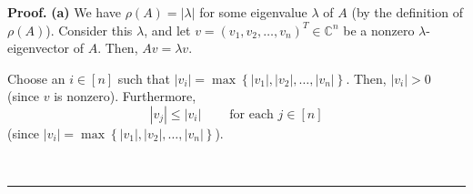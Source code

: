 \documentclass[numbers=enddot,12pt,final,onecolumn,notitlepage]{scrartcl}%
\numberwithin{exer}{subsection}
\theoremstyle{definition}
\newenvironment{proof}[1][Proof]{\noindent\textbf{#1.} }{\ \rule{0.5em}{0.5em}}
\begin{document}
\begin{proof}
\textbf{(a)} We have $\rho\left(  A\right)  =\left\vert \lambda\right\vert $
for some eigenvalue $\lambda$ of $A$ (by the definition of $\rho\left(
A\right)  $). Consider this $\lambda$, and let $v=\left(  v_{1},v_{2}%
,\ldots,v_{n}\right)  ^{T}\in\mathbb{C}^{n}$ be a nonzero $\lambda
$-eigenvector of $A$. Then, $Av=\lambda v$.

Choose an $i\in\left[  n\right]  $ such that $\left\vert v_{i}\right\vert
=\max\left\{  \left\vert v_{1}\right\vert ,\left\vert v_{2}\right\vert
,\ldots,\left\vert v_{n}\right\vert \right\}  $. Then, $\left\vert
v_{i}\right\vert >0$ (since $v$ is nonzero). Furthermore,%
\begin{equation}
\left\vert v_{j}\right\vert \leq\left\vert v_{i}\right\vert
\ \ \ \ \ \ \ \ \ \ \text{for each }j\in\left[  n\right]
\label{pf.lem.posmat.rho-in-terms-of-norms.max}%
\end{equation}
(since $\left\vert v_{i}\right\vert =\max\left\{  \left\vert v_{1}\right\vert
,\left\vert v_{2}\right\vert ,\ldots,\left\vert v_{n}\right\vert \right\}  $).


\end{proof}
\end{document}
